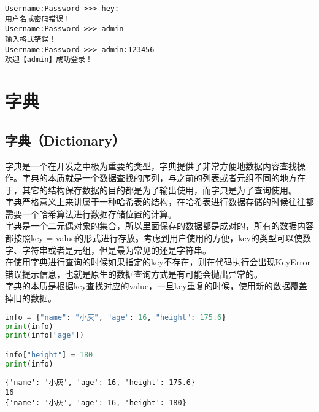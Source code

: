 \begin{tcolorbox}
	\begin{verbatim}
Username:Password >>> hey:
用户名或密码错误！
Username:Password >>> admin
输入格式错误！
Username:Password >>> admin:123456
欢迎【admin】成功登录！
\end{verbatim}
\end{tcolorbox}

\newpage

\section{字典}

\subsection{字典（Dictionary）}

字典是一个在开发之中极为重要的类型，字典提供了非常方便地数据内容查找操作。字典的本质就是一个数据查找的序列，与之前的列表或者元组不同的地方在于，其它的结构保存数据的目的都是为了输出使用，而字典是为了查询使用。\\

字典严格意义上来讲属于一种哈希表的结构，在哈希表进行数据存储的时候往往都需要一个哈希算法进行数据存储位置的计算。\\

字典是一个二元偶对象的集合，所以里面保存的数据都是成对的，所有的数据内容都按照key = value的形式进行存放。考虑到用户使用的方便，key的类型可以使数字、字符串或者是元组，但是最为常见的还是字符串。\\

在使用字典进行查询的时候如果指定的key不存在，则在代码执行会出现KeyError错误提示信息，也就是原生的数据查询方式是有可能会抛出异常的。\\

字典的本质是根据key查找对应的value，一旦key重复的时候，使用新的数据覆盖掉旧的数据。\\


\begin{lstlisting}[language=Python]
info = {"name": "小灰", "age": 16, "height": 175.6}
print(info)
print(info["age"])

info["height"] = 180
print(info)
\end{lstlisting}

\begin{tcolorbox}
	\begin{verbatim}
{'name': '小灰', 'age': 16, 'height': 175.6}
16
{'name': '小灰', 'age': 16, 'height': 180}
\end{verbatim}
\end{tcolorbox}

